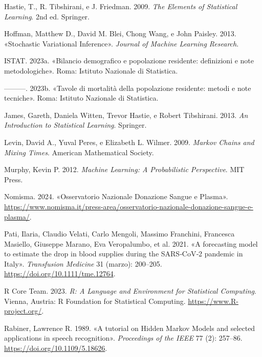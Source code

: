 \documentclass[
  italian,
  a4paper,
  a4paper,
  twoside,
  open=right,
  12pt]{scrbook}
\newlength{\cslhangindent}
\newenvironment{CSLReferences}[2] %
 {\begin{list}{}{%
  \setlength{\itemindent}{0pt}
  \setlength{\leftmargin}{0pt}
  \setlength{\parsep}{0pt}
  \ifodd #1
   \setlength{\leftmargin}{\cslhangindent}
   \setlength{\itemindent}{-1\cslhangindent}
  \fi
  \setlength{\itemsep}{#2\baselineskip}}}
 {\end{list}}
\theoremstyle{definition}
\theoremstyle{remark}
\begin{document}
\begin{CSLReferences}{1}{0}
Hastie, T., R. Tibshirani, e J. Friedman. 2009. \emph{The Elements of
Statistical Learning}. 2nd ed. Springer.

Hoffman, Matthew D., David M. Blei, Chong Wang, e John Paisley. 2013.
{«Stochastic Variational Inference»}. \emph{Journal of Machine Learning
Research}.

ISTAT. 2023a. {«Bilancio demografico e popolazione residente:
definizioni e note metodologiche»}. Roma: Istituto Nazionale di
Statistica.

---------. 2023b. {«Tavole di mortalità della popolazione residente:
metodi e note tecniche»}. Roma: Istituto Nazionale di Statistica.

James, Gareth, Daniela Witten, Trevor Hastie, e Robert Tibshirani. 2013.
\emph{An Introduction to Statistical Learning}. Springer.

Levin, David A., Yuval Peres, e Elizabeth L. Wilmer. 2009. \emph{Markov
Chains and Mixing Times}. American Mathematical Society.

Murphy, Kevin P. 2012. \emph{Machine Learning: A Probabilistic
Perspective}. MIT Press.

Nomisma. 2024. {«Osservatorio Nazionale Donazione Sangue e Plasma»}.
\url{https://www.nomisma.it/press-area/osservatorio-nazionale-donazione-sangue-e-plasma/}.

Pati, Ilaria, Claudio Velati, Carlo Mengoli, Massimo Franchini,
Francesca Masiello, Giuseppe Marano, Eva Veropalumbo, et al. 2021. {«A
forecasting model to estimate the drop in blood supplies during the
SARS‐CoV‐2 pandemic in Italy»}. \emph{Transfusion Medicine} 31 (marzo):
200--205. \url{https://doi.org/10.1111/tme.12764}.

R Core Team. 2023. \emph{R: A Language and Environment for Statistical
Computing}. Vienna, Austria: R Foundation for Statistical Computing.
\url{https://www.R-project.org/}.

Rabiner, Lawrence R. 1989. {«A tutorial on Hidden Markov Models and
selected applications in speech recognition»}. \emph{Proceedings of the
IEEE} 77 (2): 257--86. \url{https://doi.org/10.1109/5.18626}.


\end{CSLReferences}
\end{document}
